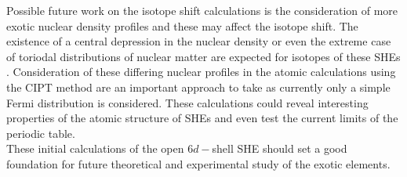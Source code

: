 \documentclass[10pt,a4paper, twoside, openright]{report}
\begin{document}
\linebreak
Possible future work on the isotope shift calculations is the consideration of more exotic nuclear density profiles and these may affect the isotope shift. The existence of a central depression in the nuclear density or even the extreme case of toriodal distributions of nuclear matter are expected for isotopes of these SHEs \cite{FD2019}. Consideration of these differing nuclear profiles in the atomic calculations using the CIPT method are an important approach to take as currently only a simple Fermi distribution is considered. These calculations could reveal interesting properties of the atomic structure of SHEs and even test the current limits of the periodic table.\\
\linebreak
These initial calculations of the open $6d-$shell SHE should set a good foundation for future theoretical and experimental study of the exotic elements. 
\appendix
\end{document}
